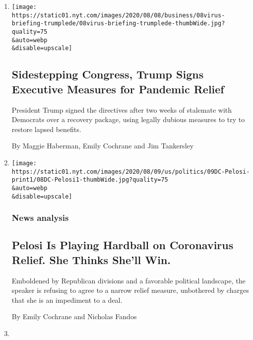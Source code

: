 \begin{enumerate}
\def\labelenumi{\arabic{enumi}.}
\item
  \href{/2020/08/08/us/politics/trump-stimulus-bill-coronavirus.html}{}

  \texttt{[image: https://static01.nyt.com/images/2020/08/08/business/08virus-briefing-trumplede/08virus-briefing-trumplede-thumbWide.jpg?quality=75\\\&auto=webp\\\&disable=upscale]}

  \hypertarget{sidestepping-congress-trump-signs-executive-measures-for-pandemic-relief}{%
  \subsection{Sidestepping Congress, Trump Signs Executive Measures for
  Pandemic
  Relief}\label{sidestepping-congress-trump-signs-executive-measures-for-pandemic-relief}}

  President Trump signed the directives after two weeks of stalemate
  with Democrats over a recovery package, using legally dubious measures
  to try to restore lapsed benefits.

  By Maggie Haberman, Emily Cochrane and Jim Tankersley
\item
  \href{/2020/08/08/us/politics/nancy-pelosi-coronavirus-relief.html}{}

  \texttt{[image: https://static01.nyt.com/images/2020/08/09/us/politics/09DC-Pelosi-print1/08DC-Pelosi1-thumbWide.jpg?quality=75\\\&auto=webp\\\&disable=upscale]}

  \hypertarget{news-analysis}{%
  \subsubsection{News analysis}\label{news-analysis}}

  \hypertarget{pelosi-is-playing-hardball-on-coronavirus-relief-she-thinks-shell-win}{%
  \subsection{Pelosi Is Playing Hardball on Coronavirus Relief. She
  Thinks She'll
  Win.}\label{pelosi-is-playing-hardball-on-coronavirus-relief-she-thinks-shell-win}}

  Emboldened by Republican divisions and a favorable political
  landscape, the speaker is refusing to agree to a narrow relief
  measure, unbothered by charges that she is an impediment to a deal.

  By Emily Cochrane and Nicholas Fandos
\item
  \href{/2020/08/07/us/politics/trump-congress-stimulus.html}{}


\end{enumerate}
